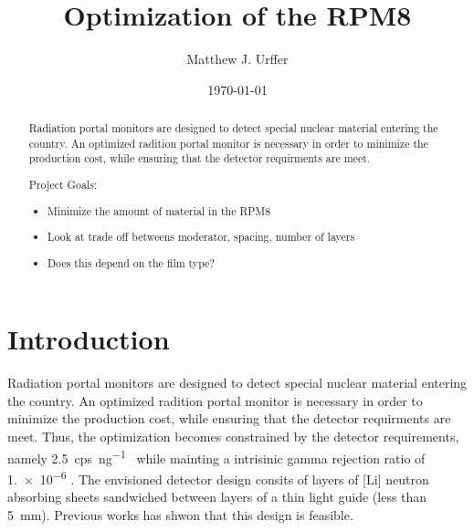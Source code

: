 \documentclass[draftcls,onecolumn]{IEEEtran}
\begin{document}
\title{Optimization of the RPM8}
\author{Matthew J. Urffer}
\date{\today}

\maketitle
\begin{abstract}
Radiation portal monitors are designed to detect special nuclear material entering the country.
An optimized radition portal monitor is necessary in order to minimize the production cost, while ensuring that the detector requirments are meet.

Project Goals:
\begin{itemize}
	\item Minimize the amount of material in the RPM8
	\item Look at trade off betweens moderator, spacing, number of layers
	\item Does this depend on the film type?
\end{itemize}
\end{abstract}

\IEEEpeerreviewmaketitle

\pagebreak
\tableofcontents
\listoftodos
\listoffigures
\listoftables
\lstlistoflistings
\pagebreak

\section{Introduction}
Radiation portal monitors are designed to detect special nuclear material entering the country.
An optimized radition portal monitor is necessary in order to minimize the production cost, while ensuring that the detector requirments are meet.
Thus, the optimization becomes constrained by the detector requirements, namely \SI{2.5}{cps\per\nano\gram{}} while mainting a intrisinic gamma rejection ratio of \num{1.e-6}  \cite{kouzes_neutron_2010,kouzes_neutron_1999}.
The envisioned detector design consits of layers of [Li] neutron absorbing sheets sandwiched between layers of a thin light guide (less than \SI{5}{\milli \meter}).
Previous works has shwon that this design is feasible.
 





\pagebreak
\appendix

\end{document}
